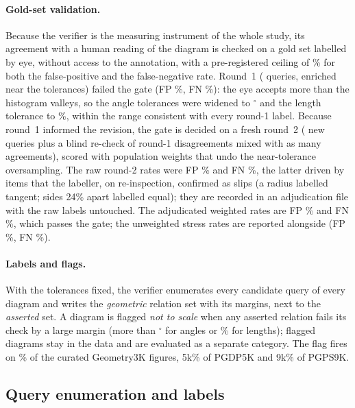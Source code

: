 \paragraph{Gold-set validation.} Because the verifier is the measuring instrument of the whole study, its agreement with a human reading of the diagram is checked on a gold set labelled by eye, without access to the annotation, with a pre-registered ceiling of \goldCeilingPct\% for both the false-positive and the false-negative rate. Round~1 (\nGoldRoundOne{} queries, enriched near the tolerances) failed the gate (FP \pctGoldRoundOneFP\%, FN \pctGoldRoundOneFN\%): the eye accepts more than the histogram valleys, so the angle tolerances were widened to \tolParallelDeg$^\circ$ and the length tolerance to \tolEqualLengthPct\%, within the range consistent with every round-1 label. Because round~1 informed the revision, the gate is decided on a fresh round~2 (\nGoldRoundTwo{} new queries plus a blind re-check of round-1 disagreements mixed with as many agreements), scored with population weights that undo the near-tolerance oversampling. The raw round-2 rates were FP \pctGoldRoundTwoWeightedFP\% and FN \pctGoldRoundTwoWeightedFN\%, the latter driven by \nGoldAdjudicated{} items that the labeller, on re-inspection, confirmed as slips (a radius labelled tangent; sides 24\% apart labelled equal); they are recorded in an adjudication file with the raw labels untouched. The adjudicated weighted rates are FP \pctGoldRoundTwoAdjFP\% and FN \pctGoldRoundTwoAdjFN\%, which passes the gate; the unweighted stress rates are reported alongside (FP \pctGoldRoundTwoAdjStressFP\%, FN \pctGoldRoundTwoAdjStressFN\%).

\paragraph{Labels and flags.} With the tolerances fixed, the verifier enumerates every candidate query of every diagram and writes the \emph{geometric} relation set with its margins, next to the \emph{asserted} set. A diagram is flagged \emph{not to scale} when any asserted relation fails its check by a large margin (more than \ntsAngleDeg$^\circ$ for angles or \ntsLengthPct\% for lengths); flagged diagrams stay in the data and are evaluated as a separate category. The flag fires on \pctNtsGeometryFigures\% of the curated Geometry3K figures, \pctNtsPgdp5k\% of PGDP5K and \pctNtsPgps9k\% of PGPS9K.

\subsection{Query enumeration and labels}

